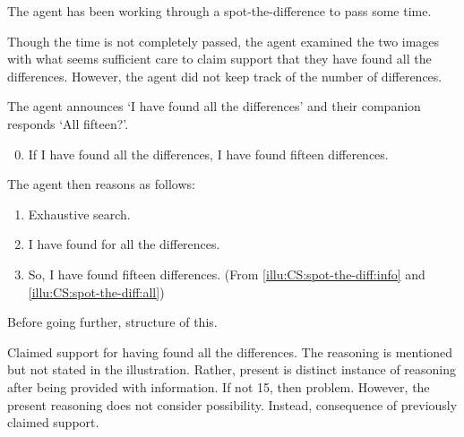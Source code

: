 \begin{note}
  \begin{illustration}\label{illu:CS:spot-the-diff}
    The agent has been working through a spot-the-difference to pass some time.

    Though the time is not completely passed, the agent examined the two images with what seems sufficient care to claim support that they have found all the differences.
    However, the agent did not keep track of the number of differences.

    The agent announces `I have found all the differences' and their companion responds `All fifteen?'.

    \begin{enumerate}[label=\arabic*., ref=(I\ref{illu:CS:spot-the-diff}.\arabic*)]
      \setcounter{enumi}{-1}
    \item\label{illu:CS:spot-the-diff:info} If I have found all the differences, I have found fifteen differences.
    \end{enumerate}

    The agent then reasons as follows:

    \begin{enumerate}[label=\arabic*., ref=(I\ref{illu:CS:spot-the-diff}.\arabic*), resume]
    \item Exhaustive search.
    \item\label{illu:CS:spot-the-diff:all} I have found for all the differences.
    \item\label{illu:CS:spot-the-diff:fif} So, I have found fifteen differences. \hfill (From \ref{illu:CS:spot-the-diff:info} and \ref{illu:CS:spot-the-diff:all})
    \end{enumerate}
  \end{illustration}

  Before going further, structure of this.

  Claimed support for having found all the differences.
  The reasoning is mentioned but not stated in the illustration.
  Rather, present is distinct instance of reasoning after being provided with information.
  If not 15, then problem.
  However, the present reasoning does not consider possibility.
  Instead, consequence of previously claimed support.
\end{note}



